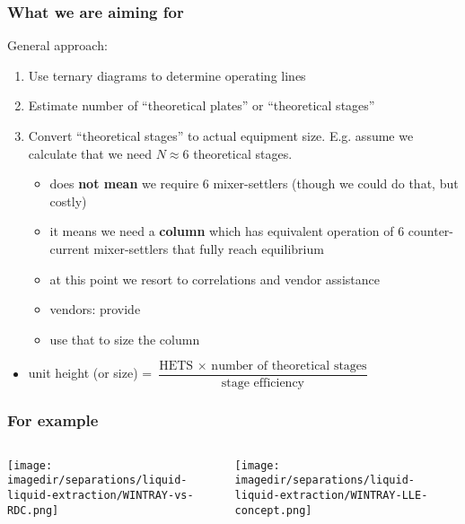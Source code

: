 \begin{frame}\frametitle{What we are aiming for}
	\vspace{12pt}
	General approach:
	\begin{enumerate}
		\item	Use ternary diagrams to determine operating lines
		\item	Estimate number of ``theoretical plates'' or ``theoretical stages''
		\item	Convert ``theoretical stages'' to actual equipment size. E.g. assume we calculate that we need $N\approx 6$ theoretical stages.
			\begin{itemize}
				\item	does \textbf{not mean} we require 6 mixer-settlers (though we could do that, but costly)
				\item	it means we need a \textbf{column} which has equivalent operation of 6 counter-current mixer-settlers that fully reach equilibrium
				\item	at this point we resort to correlations and vendor assistance
				\item	vendors: provide {\color{purple}{HETS = height equivalent to a theoretical stage}}
				\item	use that to size the column
			\end{itemize}
	\end{enumerate}
	\begin{itemize}
		\item	unit height (or size) = $\dfrac{\text{HETS} \,\, \times \,\, \text{number of theoretical stages}}{\text{stage efficiency}}$
	\end{itemize}	
\end{frame}

\begin{frame}\frametitle{For example}

	\begin{columns}[t]
			\begin{center}
				\texttt{[image: \\imagedir/separations/liquid-liquid-extraction/WINTRAY-vs-RDC.png]}
			\end{center}
			\begin{center}
				\texttt{[image: \\imagedir/separations/liquid-liquid-extraction/WINTRAY-LLE-concept.png]}
			\end{center}
	\end{columns}
	
	\vspace{24pt}
\end{frame}

